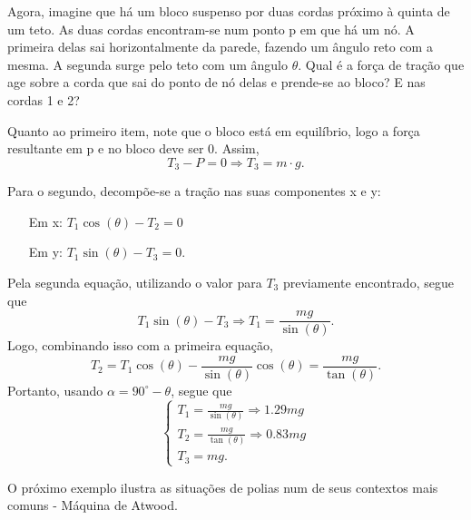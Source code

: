 \documentclass[PhysicsI/physics_notes.tex]{subfiles}
\begin{document}
\begin{example}
	Agora, imagine que há um bloco suspenso por duas cordas próximo à quinta de um teto. As duas cordas encontram-se num
	ponto p em que há um nó. A primeira delas sai horizontalmente da parede, fazendo um ângulo reto com a mesma. A segunda
	surge pelo teto com um ângulo $\theta .$ Qual é a força de tração que age sobre a corda que sai do ponto de nó
	delas e prende-se ao bloco? E nas cordas 1 e 2?

	Quanto ao primeiro item, note que o bloco está em equilíbrio, logo a força resultante em p e no bloco deve ser 0.
	Assim,
	$$
		T_{3}-P = 0 \Rightarrow  T_{3} = m \cdot g.
	$$

	Para o segundo, decompõe-se a tração nas suas componentes x e y:
	\begin{itemize}
		\item[Em x:] $T_{1}\cos{(\theta )}-T_{2}=0$
		\item[Em y:] $T_{1}\sin{(\theta )}-T_{3}=0.$
	\end{itemize}
	Pela segunda equação, utilizando o valor para $T_{3}$ previamente encontrado, segue que
	$$
		T_{1}\sin{(\theta )} - T_{3}\Rightarrow T_{1}=\frac{mg}{\sin{(\theta )}}.
	$$
	Logo, combinando isso com a primeira equação,
	$$
		T_{2}=T_{1}\cos{(\theta )} - \frac{mg}{\sin{(\theta )}}\cos{(\theta )} = \frac{mg}{\tan{(\theta )}}.
	$$
	Portanto, usando $\alpha =90^{\circ} - \theta $, segue que
	$$
		\left\{\begin{array}{ll}
			T_{1}=\frac{mg}{\sin{(\theta )}} \Rightarrow 1.29mg \\
			T_{2}=\frac{mg}{\tan{(\theta )}} \Rightarrow 0.83mg \\
			T_{3}=mg.
		\end{array}\right.
	$$
\end{example}
O próximo exemplo ilustra as situações de polias num de seus contextos mais comuns - Máquina de Atwood.
\end{document}
